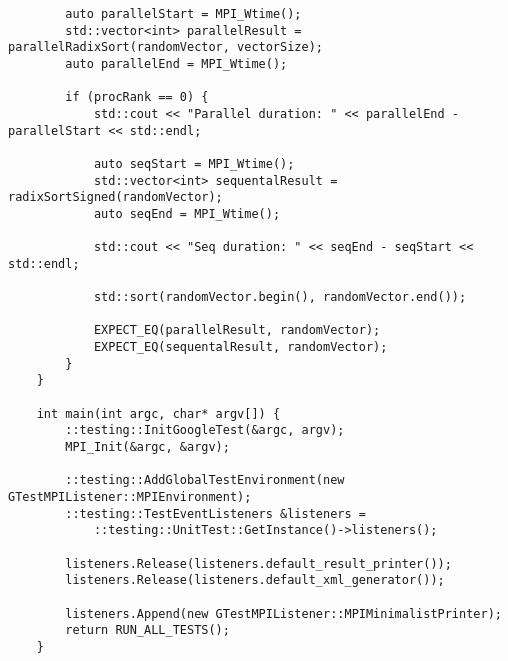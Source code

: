 \documentclass{report}
\begin{document}
\begin{lstlisting}
        auto parallelStart = MPI_Wtime();
        std::vector<int> parallelResult = parallelRadixSort(randomVector, vectorSize);
        auto parallelEnd = MPI_Wtime();
    
        if (procRank == 0) {
            std::cout << "Parallel duration: " << parallelEnd - parallelStart << std::endl;
    
            auto seqStart = MPI_Wtime();
            std::vector<int> sequentalResult = radixSortSigned(randomVector);
            auto seqEnd = MPI_Wtime();
    
            std::cout << "Seq duration: " << seqEnd - seqStart << std::endl;
    
            std::sort(randomVector.begin(), randomVector.end());
    
            EXPECT_EQ(parallelResult, randomVector);
            EXPECT_EQ(sequentalResult, randomVector);
        }
    }
    
    int main(int argc, char* argv[]) {
        ::testing::InitGoogleTest(&argc, argv);
        MPI_Init(&argc, &argv);
    
        ::testing::AddGlobalTestEnvironment(new GTestMPIListener::MPIEnvironment);
        ::testing::TestEventListeners &listeners =
            ::testing::UnitTest::GetInstance()->listeners();
    
        listeners.Release(listeners.default_result_printer());
        listeners.Release(listeners.default_xml_generator());
    
        listeners.Append(new GTestMPIListener::MPIMinimalistPrinter);
        return RUN_ALL_TESTS();
    }
\end{lstlisting}
\end{document}
